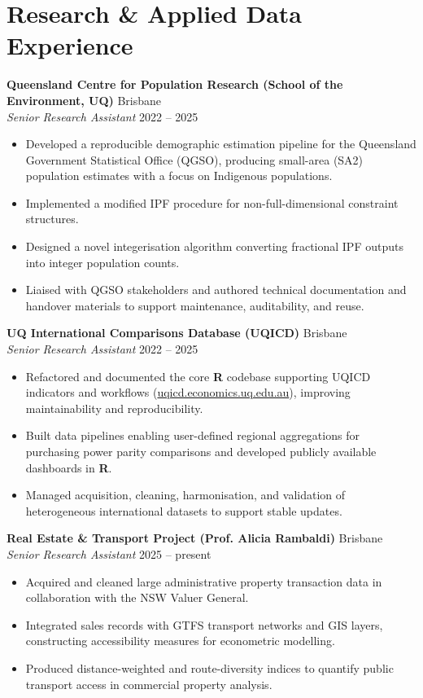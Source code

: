 \documentclass[11pt,a4paper]{article}
\begin{document}
\section{Research \& Applied Data Experience}

\textbf{Queensland Centre for Population Research (School of the Environment, UQ)} \hfill Brisbane \\
\textit{Senior Research Assistant} \hfill 2022 -- 2025
\begin{itemize}
    \item Developed a reproducible demographic estimation pipeline for the Queensland Government Statistical Office (QGSO), producing small-area (SA2) population estimates with a focus on Indigenous populations.
    \item Implemented a modified IPF procedure for non-full-dimensional constraint structures.
    \item Designed a novel integerisation algorithm converting fractional IPF outputs into integer population counts.
    \item Liaised with QGSO stakeholders and authored technical documentation and handover materials to support maintenance, auditability, and reuse.
\end{itemize}

\textbf{UQ International Comparisons Database (UQICD)} \hfill Brisbane \\
\textit{Senior Research Assistant} \hfill 2022 -- 2025
\begin{itemize}
    \item Refactored and documented the core \textbf{R} codebase supporting UQICD indicators and workflows (\href{https://uqicd.economics.uq.edu.au}{uqicd.economics.uq.edu.au}), improving maintainability and reproducibility.
    \item Built data pipelines enabling user-defined regional aggregations for purchasing power parity comparisons and developed publicly available dashboards in \textbf{R}.
    \item Managed acquisition, cleaning, harmonisation, and validation of heterogeneous international datasets to support stable updates.
\end{itemize}

\textbf{Real Estate \& Transport Project (Prof. Alicia Rambaldi)} \hfill Brisbane \\
\textit{Senior Research Assistant} \hfill 2025 -- present
\begin{itemize}
    \item Acquired and cleaned large administrative property transaction data in collaboration with the NSW Valuer General.
    \item Integrated sales records with GTFS transport networks and GIS layers, constructing accessibility measures for econometric modelling.
    \item Produced distance-weighted and route-diversity indices to quantify public transport access in commercial property analysis.
\end{itemize}
\end{document}
